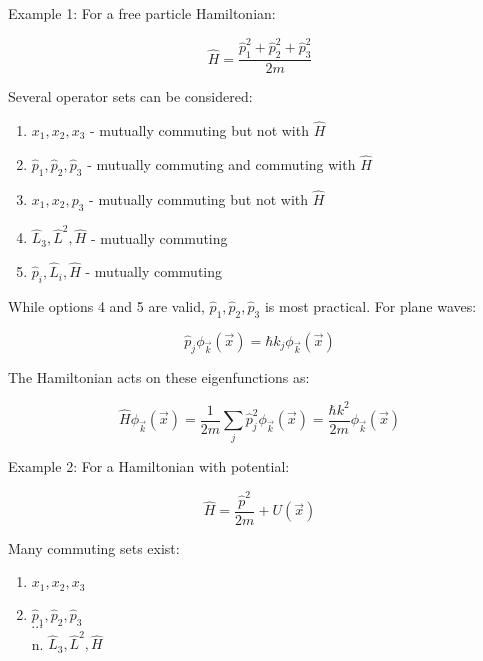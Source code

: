 \documentclass[italian]{HKNdocument}
\begin{document}
Example 1: For a free particle Hamiltonian:

\begin{equation}
\hat{H}=\frac{\hat{p}_{1}^{2}+\hat{p}_{2}^{2}+\hat{p}_{3}^{2}}{2 m} \label{eq:7.38}
\end{equation}

Several operator sets can be considered:
\begin{enumerate}
  \item $x_{1}, x_{2}, x_{3}$ - mutually commuting but not with $\hat{H}$
  \item $\hat{p}_{1}, \hat{p}_{2}, \hat{p}_{3}$ - mutually commuting and commuting with $\hat{H}$
  \item $x_{1}, x_{2}, p_{3}$ - mutually commuting but not with $\hat{H}$
  \item $\hat{L}_{3}, \hat{L}^{2}, \hat{H}$ - mutually commuting
  \item $\hat{p}_{i}, \hat{L}_{i}, \hat{H}$ - mutually commuting
\end{enumerate}

While options 4 and 5 are valid, $\hat{p}_{1}, \hat{p}_{2}, \hat{p}_{3}$ is most practical. For plane waves:

\begin{equation}
\hat{p}_{j} \phi_{\vec{k}}(\vec{x})=\hbar k_{j} \phi_{\vec{k}}(\vec{x}) \label{eq:7.39}
\end{equation}

The Hamiltonian acts on these eigenfunctions as:

\begin{equation}
\hat{H} \phi_{\vec{k}}(\vec{x})=\frac{1}{2 m} \sum_{j} \hat{p}_{j}^{2} \phi_{\vec{k}}(\vec{x})=\frac{\hbar k^{2}}{2 m} \phi_{\vec{k}}(\vec{x}) \label{eq:7.40}
\end{equation}

Example 2: For a Hamiltonian with potential:

\begin{equation}
\hat{H}=\frac{\hat{p}^{2}}{2 m}+U(\vec{x}) \label{eq:7.41}
\end{equation}

Many commuting sets exist:
\begin{enumerate}
  \item $x_{1}, x_{2}, x_{3}$
  \item $\hat{p}_{1}, \hat{p}_{2}, \hat{p}_{3}$\\
$\cdots$\\
n. $\hat{L}_{3}, \hat{L}^{2}, \hat{H}$
\end{enumerate}
\end{document}
